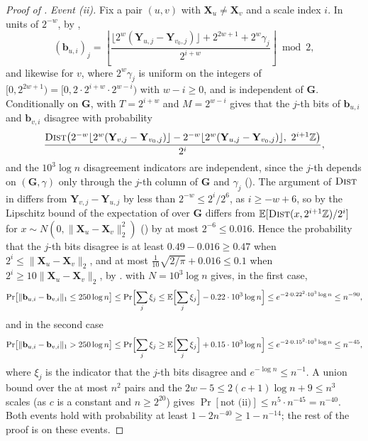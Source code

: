 \documentclass[11pt]{article}
\theoremstyle{remark}
\newcommand{\GG}{\mathbf G}
\newcommand{\XX}{\mathbf X}
\newcommand{\YY}{\mathbf{Y}}
\newcommand{\Ex}{\mathbb E}
\newcommand{\norm}[1]{\lVert#1\rVert}
\newcommand{\bb}{\mathbf b}
\newcommand{\Z}{\mathbb Z}
\newcommand{\dist}{\textsc{Dist}}
\begin{document}
\begin{proof}[Proof of ]
\emph{Event (ii).}
Fix a pair $(u,v)$ with $\XX_u\neq\XX_v$ and a scale index $i$.
In units of $2^{-w}$, by ,
\[
(\bb_{u,i})_j=\left\lfloor\frac{\lfloor2^{w}(\YY_{u,j}-\YY_{v_0,j})\rfloor
+2^{2w+1}+2^{w}\gamma_j}{2^{i+w}}\right\rfloor\bmod2,
\]
and likewise for $v$, where $2^{w}\gamma_j$ is uniform on the integers of
$[0,2^{2w+1})=[0,2\cdot2^{i+w}\cdot2^{w-i})$ with $w-i\ge0$, and is independent
of $\GG$.
Conditionally on $\GG$,  with $T=2^{i+w}$ and
$M=2^{w-i}$ gives that the $j$-th bits of $\bb_{u,i}$ and $\bb_{v,i}$
disagree with probability
\begin{equation}\label{eq:packed-disagree}
\frac{\dist\bigl(2^{-w}\lfloor2^{w}(\YY_{v,j}-\YY_{v_0,j})\rfloor
-2^{-w}\lfloor2^{w}(\YY_{u,j}-\YY_{v_0,j})\rfloor,\ 2^{i+1}\Z\bigr)}{2^{i}} ,
\end{equation}
and the $10^{3}\log n$ disagreement indicators are independent, since the
$j$-th depends on $(\GG,\gamma)$ only through the $j$-th column of $\GG$
and $\gamma_j$ ().
The argument of $\dist$ in  differs from
$\YY_{v,j}-\YY_{u,j}$ by less than $2^{-w}\le2^{i}/2^{6}$, as $i\ge-w+6$, so by
the Lipschitz bound of  the expectation of
 over $\GG$ differs from
$\Ex[\dist(x,2^{i+1}\Z)/2^{i}]$ for $x\sim N(0,\norm{\XX_u-\XX_v}_2^{2})$
() by at most $2^{-6}\le0.016$.
Hence the probability that the $j$-th bits disagree is at least
$0.49-0.016\ge0.47$ when $2^{i}\le\norm{\XX_u-\XX_v}_2$, and at most
$\frac1{10}\sqrt{2/\pi}+0.016\le0.1$ when $2^{i}\ge10\norm{\XX_u-\XX_v}_2$, by
.
 with $N=10^{3}\log n$ gives, in the first case,
\[
\Pr\bigl[\norm{\bb_{u,i}-\bb_{v,i}}_1\le250\log n\bigr]
\le\Pr\Bigl[\sum_j\xi_j\le\Ex\Bigl[\sum_j\xi_j\Bigr]-0.22\cdot10^{3}\log n\Bigr]
\le e^{-2\cdot0.22^{2}\cdot10^{3}\log n}\le n^{-90},
\]
and in the second case
\[
\Pr\bigl[\norm{\bb_{u,i}-\bb_{v,i}}_1>250\log n\bigr]
\le\Pr\Bigl[\sum_j\xi_j\ge\Ex\Bigl[\sum_j\xi_j\Bigr]+0.15\cdot10^{3}\log n\Bigr]
\le e^{-2\cdot0.15^{2}\cdot10^{3}\log n}\le n^{-45},
\]
where $\xi_j$ is the indicator that the $j$-th bits disagree and
$e^{-\log n}\le n^{-1}$.
A union bound over the at most $n^{2}$ pairs and the
$2w-5\le2(c+1)\log n+9\le n^{3}$
scales (as $c$ is a constant and $n\ge2^{20}$) gives
$\Pr[\text{not (ii)}]\le n^{5}\cdot n^{-45}=n^{-40}$.
Both events hold with probability at least $1-2n^{-40}\ge1-n^{-14}$; the
rest of the proof is on these events.


\end{proof}
\end{document}
